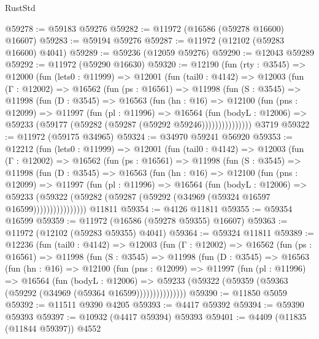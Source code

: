 \begin{lexlean}{RustStd}
\begin{coremodule}
@59278 := @59183 @59276
@59282 := @11972 (@16586 (@59278 @16600) @16607)
@59283 := @59194 @59276
@59287 := @11972 (@12102 (@59283 @16600) @4041)
@59289 := @59236 (@12059 @59276)
@59290 := @12043 @59289
@59292 := @11972 (@59290 @16630)
@59320 := @12190
    (fun (rty : @3545) =>
    @12000
      (fun (lets0 : @11999) =>
      @12001
        (fun (tail0 : @4142) =>
        @12003
          (fun (Γ : @12002) =>
          @16562
            (fun (ps : @16561) =>
            @11998
              (fun (S : @3545) =>
              @11998
                (fun (D : @3545) =>
                @16563
                  (fun (hn : @16) =>
                  @12100
                    (fun (pns : @12099) =>
                    @11997
                      (fun (pl : @11996) =>
                      @16564
                        (fun (bodyL : @12006) =>
                        @59233 (@59177 (@59282 (@59287 (@59292 @59246)))))))))))))))
    @3719
@59322 := @11972 (@59175 @34965)
@59324 := @34970 @59241 @56920
@59353 := @12212
    (fun (lets0 : @11999) =>
    @12001
      (fun (tail0 : @4142) =>
      @12003
        (fun (Γ : @12002) =>
        @16562
          (fun (ps : @16561) =>
          @11998
            (fun (S : @3545) =>
            @11998
              (fun (D : @3545) =>
              @16563
                (fun (hn : @16) =>
                @12100
                  (fun (pns : @12099) =>
                  @11997
                    (fun (pl : @11996) =>
                    @16564
                      (fun (bodyL : @12006) =>
                      @59233
                        (@59322
                          (@59282 (@59287 (@59292 (@34969 (@59324 @16597 @16599))))))))))))))))
    @11811
@59354 := @4126 @11811
@59355 := @59354 @16599
@59359 := @11972 (@16586 (@59278 @59355) @16607)
@59363 := @11972 (@12102 (@59283 @59355) @4041)
@59364 := @59324 @11811
@59389 := @12236
    (fun (tail0 : @4142) =>
    @12003
      (fun (Γ : @12002) =>
      @16562
        (fun (ps : @16561) =>
        @11998
          (fun (S : @3545) =>
          @11998
            (fun (D : @3545) =>
            @16563
              (fun (hn : @16) =>
              @12100
                (fun (pns : @12099) =>
                @11997
                  (fun (pl : @11996) =>
                  @16564
                    (fun (bodyL : @12006) =>
                    @59233 (@59322 (@59359 (@59363 (@59292 (@34969 (@59364 @16599)))))))))))))))
@59390 := @11850 @5059
@59392 := @11511 @9390 @4205
@59393 := @4417 @59392
@59394 := @59390 @59393
@59397 := @10932 (@4417 @59394) @59393
@59401 := @4409 (@11835 (@11844 @59397)) @4552

\end{coremodule}
\end{lexlean}

